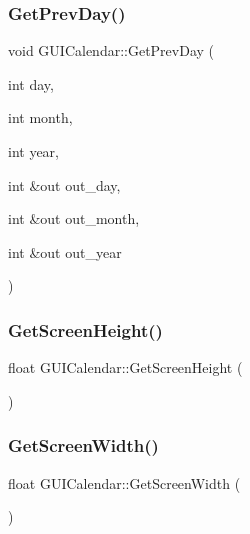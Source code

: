 \hypertarget{class_g_u_i_calendar_ab0d6f371e6dbff23d97a9b31e20e5ec2}{}\label{class_g_u_i_calendar_ab0d6f371e6dbff23d97a9b31e20e5ec2} 
\subsubsection{\texorpdfstring{Get\+Prev\+Day()}{GetPrevDay()}}
{\footnotesize\ttfamily void G\+U\+I\+Calendar\+::\+Get\+Prev\+Day (\begin{DoxyParamCaption}\item[{int}]{day,  }\item[{int}]{month,  }\item[{int}]{year,  }\item[{int \&out}]{out\+\_\+day,  }\item[{int \&out}]{out\+\_\+month,  }\item[{int \&out}]{out\+\_\+year }\end{DoxyParamCaption})}

\hypertarget{class_g_u_i_calendar_a0176610588e58488c8c5976cbbdce873}{}\label{class_g_u_i_calendar_a0176610588e58488c8c5976cbbdce873} 
\subsubsection{\texorpdfstring{Get\+Screen\+Height()}{GetScreenHeight()}}
{\footnotesize\ttfamily float G\+U\+I\+Calendar\+::\+Get\+Screen\+Height (\begin{DoxyParamCaption}{ }\end{DoxyParamCaption})}

\hypertarget{class_g_u_i_calendar_a0e71b9f86c524369f82601de8156efad}{}\label{class_g_u_i_calendar_a0e71b9f86c524369f82601de8156efad} 
\subsubsection{\texorpdfstring{Get\+Screen\+Width()}{GetScreenWidth()}}
{\footnotesize\ttfamily float G\+U\+I\+Calendar\+::\+Get\+Screen\+Width (\begin{DoxyParamCaption}{ }\end{DoxyParamCaption})}

